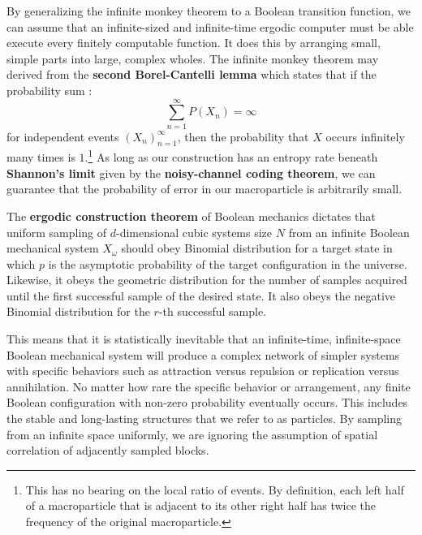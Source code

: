 \documentclass[10pt, a5paper, twoside, openright]{memoir}
\begin{document}
By generalizing the infinite monkey theorem to a Boolean transition function, we can assume that an infinite-sized and infinite-time ergodic computer must be able execute every finitely computable function. It does this by arranging small, simple parts into large, complex wholes. The infinite monkey theorem may derived from the \textbf{second Borel-Cantelli lemma} which states that if the probability sum :
$$\sum\limits^\infty_{n=1}P(X_n) = \infty$$ 
for independent events $(X_n)^\infty_{n=1}$, then the probability that $X$ occurs infinitely many times is $1$.\footnote{This has no bearing on the local ratio of events. By definition, each left half of a macroparticle that is adjacent to its other right half has twice the frequency of the original macroparticle.} As long as our construction has an entropy rate beneath \textbf{Shannon's limit} given by the \textbf{noisy-channel coding theorem}, we can guarantee that the probability of error in our macroparticle is arbitrarily small. 

The \textbf{ergodic construction theorem} of Boolean mechanics dictates that uniform sampling of $d$-dimensional cubic systems size $N$ from an infinite Boolean mechanical system $X_\omega$ should obey Binomial distribution for a target state in which $p$ is the asymptotic probability of the target configuration in the universe. Likewise, it obeys the geometric distribution for the number of samples acquired until the first successful sample of the desired state. It also obeys the negative Binomial distribution for the $r$-th successful sample. 

This means that it is statistically inevitable that an infinite-time, infinite-space Boolean mechanical system will produce a complex network of simpler systems with specific behaviors such as attraction versus repulsion or replication versus annihilation. No matter how rare the specific behavior or arrangement, any finite Boolean configuration with non-zero probability eventually occurs. This includes the stable and long-lasting structures that we refer to as particles. By sampling from an infinite space uniformly, we are ignoring the assumption of spatial correlation of adjacently sampled blocks.
\end{document}
